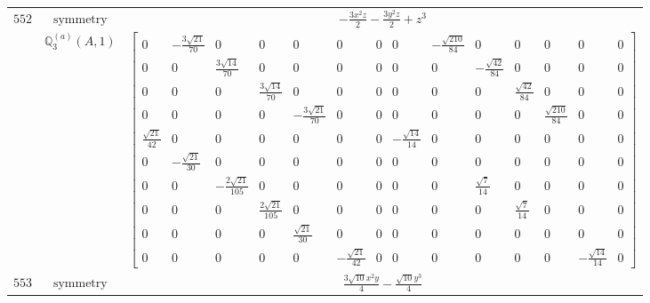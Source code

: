 \documentclass[fleqn,8pt,landscape]{jsarticle}
\begin{document}
\begin{longtable}{ccc}
$ 552 $ & $ \text{symmetry} $ & $ - \frac{3 x^{2} z}{2} - \frac{3 y^{2} z}{2} + z^{3} $ \\
$  $ & $ \mathbb{Q}_{3}^{(a)}(A,1) $ & $ \begin{bmatrix} 0 & - \frac{3 \sqrt{21}}{70} & 0 & 0 & 0 & 0 & 0 & 0 & - \frac{\sqrt{210}}{84} & 0 & 0 & 0 & 0 & 0 \\ 0 & 0 & \frac{3 \sqrt{14}}{70} & 0 & 0 & 0 & 0 & 0 & 0 & - \frac{\sqrt{42}}{84} & 0 & 0 & 0 & 0 \\ 0 & 0 & 0 & \frac{3 \sqrt{14}}{70} & 0 & 0 & 0 & 0 & 0 & 0 & \frac{\sqrt{42}}{84} & 0 & 0 & 0 \\ 0 & 0 & 0 & 0 & - \frac{3 \sqrt{21}}{70} & 0 & 0 & 0 & 0 & 0 & 0 & \frac{\sqrt{210}}{84} & 0 & 0 \\ \frac{\sqrt{21}}{42} & 0 & 0 & 0 & 0 & 0 & 0 & - \frac{\sqrt{14}}{14} & 0 & 0 & 0 & 0 & 0 & 0 \\ 0 & - \frac{\sqrt{21}}{30} & 0 & 0 & 0 & 0 & 0 & 0 & 0 & 0 & 0 & 0 & 0 & 0 \\ 0 & 0 & - \frac{2 \sqrt{21}}{105} & 0 & 0 & 0 & 0 & 0 & 0 & \frac{\sqrt{7}}{14} & 0 & 0 & 0 & 0 \\ 0 & 0 & 0 & \frac{2 \sqrt{21}}{105} & 0 & 0 & 0 & 0 & 0 & 0 & \frac{\sqrt{7}}{14} & 0 & 0 & 0 \\ 0 & 0 & 0 & 0 & \frac{\sqrt{21}}{30} & 0 & 0 & 0 & 0 & 0 & 0 & 0 & 0 & 0 \\ 0 & 0 & 0 & 0 & 0 & - \frac{\sqrt{21}}{42} & 0 & 0 & 0 & 0 & 0 & 0 & - \frac{\sqrt{14}}{14} & 0 \end{bmatrix} $ \\ \hline
$ 553 $ & $ \text{symmetry} $ & $ \frac{3 \sqrt{10} x^{2} y}{4} - \frac{\sqrt{10} y^{3}}{4} $ \\

\end{longtable}
\end{document}
